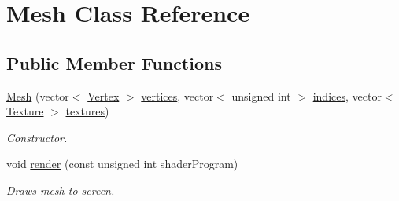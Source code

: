 \hypertarget{class_mesh}{}\section{Mesh Class Reference}
\label{class_mesh}
\subsection*{Public Member Functions}
\begin{DoxyCompactItemize}
\item 
\mbox{\label{class_mesh_a2d6c71adb66e5f270cee7a60c4e23018}} 
\mbox{\hyperlink{class_mesh_a2d6c71adb66e5f270cee7a60c4e23018}{Mesh}} (vector$<$ \mbox{\hyperlink{struct_vertex}{Vertex}} $>$ \mbox{\hyperlink{class_mesh_abe5c05c224e47ba1e8b6393759798a9b}{vertices}}, vector$<$ unsigned int $>$ \mbox{\hyperlink{class_mesh_a464d9a1d7e7a4f67321dffc1e8b44b7d}{indices}}, vector$<$ \mbox{\hyperlink{struct_texture}{Texture}} $>$ \mbox{\hyperlink{class_mesh_a09bf4e8307bf7717c56501ca6293c6c0}{textures}})
\begin{DoxyCompactList}\small\item\em Constructor. \end{DoxyCompactList}\item 
\mbox{\label{class_mesh_a9a6ec018bec776cb7b31fb8433c8a7e7}} 
void \mbox{\hyperlink{class_mesh_a9a6ec018bec776cb7b31fb8433c8a7e7}{render}} (const unsigned int shader\+Program)
\begin{DoxyCompactList}\small\item\em Draws mesh to screen. \end{DoxyCompactList}\end{DoxyCompactItemize}
